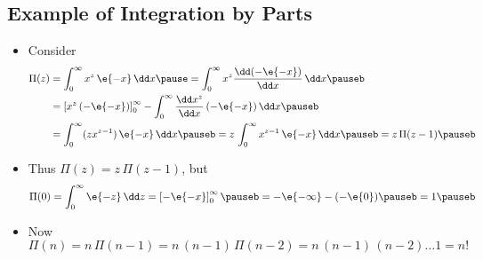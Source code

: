 \begin{slide}
\section[-2]{Example of Integration by Parts}

\begin{PauseHighLight}
  \begin{itemize}
  \item Consider
    \begin{align*}
      \Pi(z) &= \int_0^\infty x^z \, \e{-x} \, \dd x\pause = 
      \int_0^\infty x^z \frac{\dd (-\e{-x})}{\dd x} \, \dd x \pauseb\\
      &= \left[ x^z\, (-\e{-x})  \right]_0^\infty - \int_0^\infty 
        \frac{\dd x^z}{\dd x}\, (-\e{-x}) \, \dd x\pauseb\\
             &= \int_0^\infty  (z x^{z-1}) \, \e{-x} \, \dd x \pauseb
               = z\,\int_0^\infty x^{z-1} \,  \e{-x} \,  \dd x \pauseb
               = z\,\Pi(z-1) \pauseb
    \end{align*}
  \item Thus $\Pi(z) = z\, \Pi(z-1)$, but
    \begin{align*}
      \Pi(0) = \int_0^\infty \e{-z} \,\dd z = \left[ -\e{-x}
      \right]_0^\infty\pauseb
      = -\e{-\infty} - (-\e{0}) \pauseb = 1\pauseb
    \end{align*}
  \item Now $\Pi(n) = n\,\Pi(n-1) = n\,(n-1)\,\Pi(n-2) =
    n\,(n-1)\,(n-2)\ldots1 = n!$\pauseb
  \end{itemize}
\end{PauseHighLight}

\end{slide}


